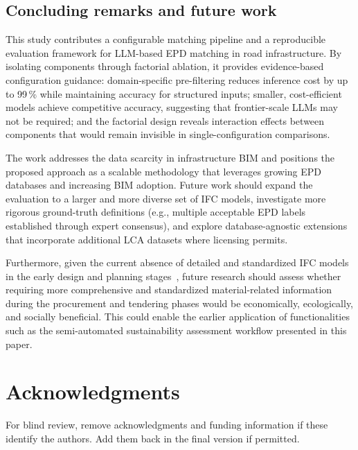 \documentclass[10pt, a4paper, twocolumn]{article}
\begin{document}
\subsection{Concluding remarks and future work}

This study contributes a configurable matching pipeline and a reproducible
evaluation framework for LLM-based EPD matching in road infrastructure. By
isolating components through factorial ablation, it provides evidence-based
configuration guidance: domain-specific pre-filtering reduces inference cost by up
to 99\,\% while maintaining accuracy for structured inputs; smaller, cost-efficient
models achieve competitive accuracy, suggesting that frontier-scale LLMs may not be
required; and the factorial design reveals interaction effects between components
that would remain invisible in single-configuration comparisons.

The work addresses the data scarcity in infrastructure BIM and positions the
proposed approach as a scalable methodology that leverages growing EPD databases
and increasing BIM adoption. Future work should expand the evaluation to a larger
and more diverse set of IFC models, investigate more rigorous ground-truth
definitions (e.g., multiple acceptable EPD labels established through expert
consensus), and explore database-agnostic extensions that incorporate additional
LCA datasets where licensing permits.

Furthermore, given the current absence of detailed and standardized IFC models in the early design and planning stages~\cite{RWTHAachenUniversity.2025}, future research should assess whether requiring more comprehensive and standardized material-related information during the procurement and tendering phases would be economically, ecologically, and socially beneficial.  This could enable the earlier application of functionalities such as the semi-automated sustainability assessment workflow presented in this paper. 

\section*{Acknowledgments}

For blind review, remove acknowledgments and funding information if these
identify the authors. Add them back in the final version if permitted.











\end{document}
